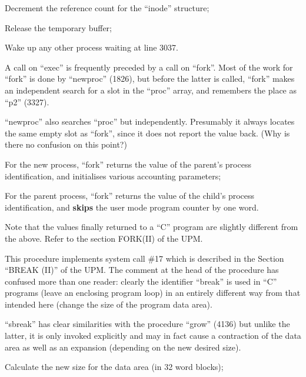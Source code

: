 \item[3194:] Decrement the reference count for
 the ``inode'' structure;

\item[3195:] Release the temporary buffer;

\item[3196:] Wake up any other process waiting
 at line 3037.
\ed



A call on ``exec'' is frequently preceded
by a call on ``fork''. Most of the work
for ``fork'' is done by ``newproc'' (1826),
but before the latter is called, ``fork''
makes an independent search for a slot
in the ``proc'' array, and remembers the
place as ``p2'' (3327).

``newproc'' also searches ``proc'' but
independently. Presumably it always
locates the same empty slot as ``fork'',
since it does not report the value
back. (Why is there no confusion on
this point?)

\bd
\item[3335:] For the new process, ``fork''
returns the value of the parent's
process identification, and initialises various accounting
parameters;

\item[3344:] For the parent process, ``fork''
returns the value of the child's
process identification, and {\bf skips}
the user mode program counter by
one word.
\ed

\noindent Note that the values finally returned
to a ``C'' program are slightly different
from the above. Refer to the section
FORK(II) of the UPM.


This procedure implements system call
\#17 which is described in the Section
``BREAK (II)'' of the UPM. The comment at
the head of the procedure has confused
more than one reader: clearly the identifier
``break'' is used in ``C'' programs
(leave an enclosing program loop) in an
entirely different way from that
intended here (change the size of the
program data area).

``sbreak'' has clear similarities with
the procedure ``grow'' (4136) but unlike
the latter, it is only invoked explicitly and
may in fact cause a contraction of the data area as well as an
expansion (depending on the new desired
size).

\bd
\item[3364:] Calculate the new size for the
 data area (in 32 word blocks);

